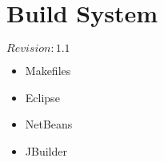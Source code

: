 \chapter{Build System}

$Revision: 1.1 $

\begin{itemize}
\item Makefiles
\item Eclipse
\item NetBeans
\item JBuilder
\end{itemize}

{\todo}

